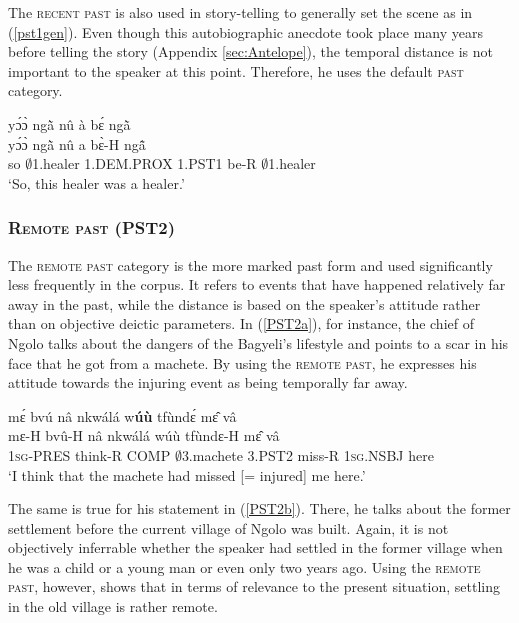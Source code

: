 The \textsc{recent past} is also used in story-telling to generally set the scene as in (\ref{pst1gen}). Even though this autobiographic anecdote took place many years before telling the story (Appendix \ref{sec:Antelope}), the temporal distance is not important to the speaker at this point. Therefore, he uses the default \textsc{past} category.

\begin{exe} 
\ex\label{pst1gen}
  \glll   yɔ́ɔ̀ ngã̀ nû à bɛ́ ngã̀   \\
          yɔ́ɔ̀ ngã̀ nû a bɛ̀-H ngã̂ \\
         so $\emptyset$1.healer 1.DEM.PROX 1.PST1 be-R $\emptyset$1.healer   \\
    \trans `So, this healer was a healer.'
\end{exe}



\subsubsection{\textsc{Remote past (PST2)}}
\label{sec:pst2}

The \textsc{remote past} category is the more marked past form and used significantly less frequently in the corpus. It refers to events that have happened relatively far away in the past, while the distance is based on the speaker's attitude rather than on objective deictic parameters. 
 In (\ref{PST2a}), for instance, the chief of Ngolo talks about the dangers of the Bagyeli's lifestyle and points to a scar in his face that he got from a machete. By using the \textsc{remote past}, he expresses his attitude towards the injuring event as being temporally far away.

\begin{exe} 
\ex\label{PST2a}
  \glll    mɛ́ bvú nâ nkwálá w{\bfseries úù} tfùndɛ́ mɛ̂ vâ \\
           mɛ-H bvû-H nâ nkwálá wúù tfùndɛ-H mɛ̂ vâ \\
              1\textsc{sg}-PRES think-R COMP $\emptyset$3.machete 3.PST2 miss-R 1\textsc{sg}.NSBJ here \\
    \trans `I think that the machete had missed [= injured] me here.'
\end{exe}

\noindent The same is true for his statement in (\ref{PST2b}). There, he talks about the former settlement before the current village of Ngolo was built. Again, it is not objectively inferrable whether the speaker had settled in the former village when he was a child or a young man or even only two years ago. Using the \textsc{remote past}, however, shows that in terms of relevance to the present situation, settling in the old village is rather remote.

